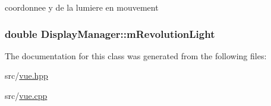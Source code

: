 coordonnee y de la lumiere en mouvement 

\hypertarget{class_display_manager_acfa75a1e8befcd84812d8cc667356704}{
\subsubsection[{m\+Revolution\+Light}]{\setlength{\rightskip}{0pt plus 5cm}double Display\+Manager\+::m\+Revolution\+Light}}\label{class_display_manager_acfa75a1e8befcd84812d8cc667356704}


The documentation for this class was generated from the following files\+:\begin{DoxyCompactItemize}
\item 
src/\hyperlink{vue_8hpp}{vue.\+hpp}\item 
src/\hyperlink{vue_8cpp}{vue.\+cpp}\end{DoxyCompactItemize}

